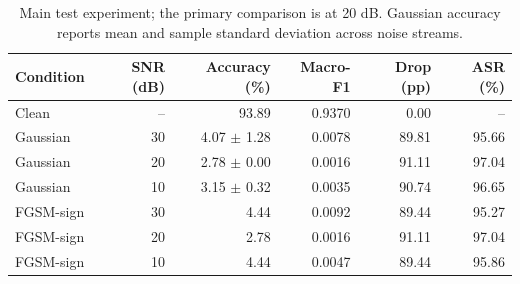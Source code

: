 \begin{table}[t]
\centering
\caption{Main test experiment; the primary comparison is at 20 dB. Gaussian accuracy reports mean and sample standard deviation across noise streams.}
\label{tab:test_results}
\begin{tabular}{lrrrrr}
\hline
Condition & SNR (dB) & Accuracy (\%) & Macro-F1 & Drop (pp) & ASR (\%) \\
\hline
Clean & -- & 93.89 & 0.9370 & 0.00 & -- \\
Gaussian & 30 & 4.07 $\pm$ 1.28 & 0.0078 & 89.81 & 95.66 \\
Gaussian & 20 & 2.78 $\pm$ 0.00 & 0.0016 & 91.11 & 97.04 \\
Gaussian & 10 & 3.15 $\pm$ 0.32 & 0.0035 & 90.74 & 96.65 \\
FGSM-sign & 30 & 4.44 & 0.0092 & 89.44 & 95.27 \\
FGSM-sign & 20 & 2.78 & 0.0016 & 91.11 & 97.04 \\
FGSM-sign & 10 & 4.44 & 0.0047 & 89.44 & 95.86 \\
\hline
\end{tabular}
\end{table}
